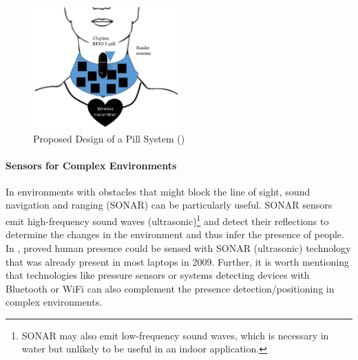 \begin{figure}[H]    
    \centering
    \includegraphics[width=0.5\textwidth]{Images/RFIDswallow.png}
    \caption{Proposed Design of a Pill System (\cite{he2020medicalRFID})}
    \label{fig:RFID_swallow}
\end{figure}

\paragraph{Sensors for Complex Environments}
In environments with obstacles that might block the line of sight, sound navigation and ranging (SONAR) can be particularly useful. SONAR sensors emit high-frequency sound waves (ultrasonic)\footnote{SONAR may also emit low-frequency sound waves, which is necessary in water but unlikely to be useful in an indoor application.} and detect their reflections to determine the changes in the environment and thus infer the presence of people. In \citeyear{ta2009sonarbasedhumanpresence}, \citeauthor{ta2009sonarbasedhumanpresence} proved human presence could be sensed with SONAR (ultrasonic) technology that was already present in most laptops in 2009. Further, it is worth mentioning that technologies like pressure sensors or systems detecting devices with Bluetooth or WiFi can also complement the presence detection/positioning in complex environments.
